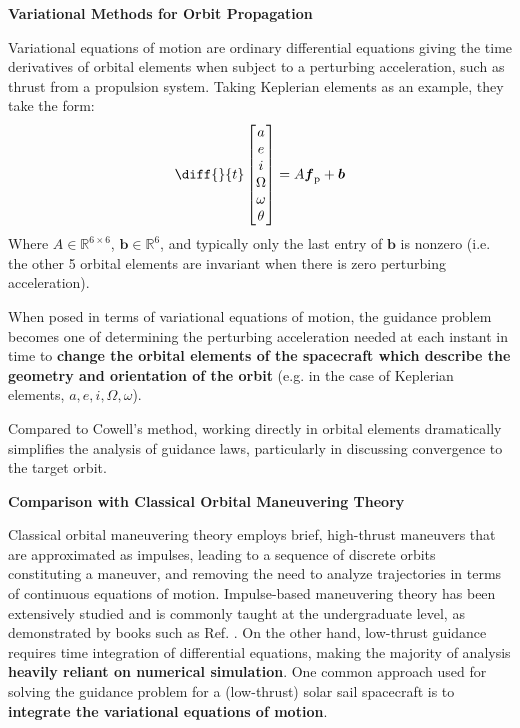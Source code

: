 \textbf{Variational Methods for Orbit Propagation}

Variational equations of motion are ordinary differential equations giving the time derivatives of orbital elements when subject to a perturbing acceleration, such as thrust from a propulsion system. Taking Keplerian elements as an example, they take the form:
\begin{equation*}
  \diff{}{t}
  \begin{bmatrix}
    a \\e\\i\\ \Omega \\ \omega \\ \theta
  \end{bmatrix}
  = A \boldsymbol{f}_\mathrm{p} + \boldsymbol{b}
\end{equation*}
Where \(A \in \mathbb{R}^{6\times6}\), \(\boldsymbol{b} \in  \mathbb{R}^{6}\), and typically only the last entry of \(\boldsymbol{b}\) is nonzero (i.e. the other 5 orbital elements are invariant when there is zero perturbing acceleration).

When posed in terms of variational equations of motion, the guidance problem becomes one of determining the perturbing acceleration needed at each instant in time to \textbf{change the orbital elements of the spacecraft which describe the geometry and orientation of the orbit} (e.g. in the case of Keplerian elements, \(a, e, i , \Omega, \omega\)).

Compared to Cowell's method, working directly in orbital elements dramatically simplifies the analysis of guidance laws, particularly in discussing convergence to the target orbit.

\textbf{Comparison with Classical Orbital Maneuvering Theory}

Classical orbital maneuvering theory employs brief, high-thrust maneuvers that are approximated as impulses, leading to a sequence of discrete orbits constituting a maneuver, and removing the need to analyze trajectories in terms of continuous equations of motion. Impulse-based maneuvering theory has been extensively studied and is commonly taught at the undergraduate level, as demonstrated by books such as Ref. \cite{book:1487513}. On the other hand, low-thrust guidance requires time integration of differential equations, making the majority of analysis \textbf{heavily reliant on numerical simulation}. One common approach used for solving the guidance problem for a (low-thrust) solar sail spacecraft is to \textbf{integrate the variational equations of motion}.

